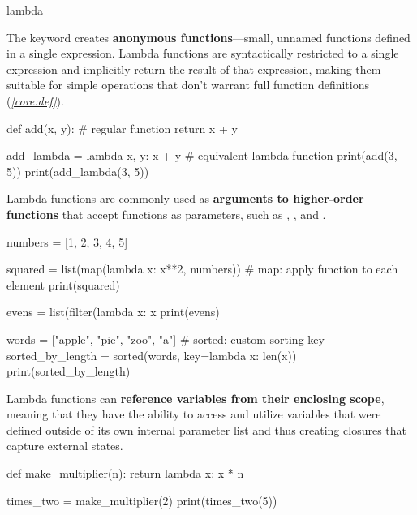\documentclass[10pt]{article}
\begin{document}
  \begin{core}{lambda}

    The  keyword creates \textbf{anonymous functions}---small, unnamed functions defined in a single expression. Lambda functions are syntactically restricted to a single expression and implicitly return the result of that expression, making them suitable for simple operations that don't warrant full function definitions (\textit{\autoref{core:def}}).

    \begin{pyconsole}

      def add(x, y): # regular function
          return x + y
      
      add_lambda = lambda x, y: x + y # equivalent lambda function
      print(add(3, 5))
      print(add_lambda(3, 5))

    \end{pyconsole}
    
    Lambda functions are commonly used as \textbf{arguments to higher-order functions} that accept functions as parameters, such as , , and .

    \begin{pyconsole}

      numbers = [1, 2, 3, 4, 5]
      
      squared = list(map(lambda x: x**2, numbers)) # map: apply function to each element
      print(squared)
      
      evens = list(filter(lambda x: x %
      print(evens)
      
      words = ["apple", "pie", "zoo", "a"] # sorted: custom sorting key
      sorted_by_length = sorted(words, key=lambda x: len(x))
      print(sorted_by_length)

    \end{pyconsole}
    
    Lambda functions can \textbf{reference variables from their enclosing scope}, meaning that they have the ability to access and utilize variables that were defined outside of its own internal parameter list and thus creating closures that capture external states.

    \begin{pyconsole}

      def make_multiplier(n):
          return lambda x: x * n
      
      times_two = make_multiplier(2)
      print(times_two(5))

    \end{pyconsole}

  \end{core}
\end{document}
